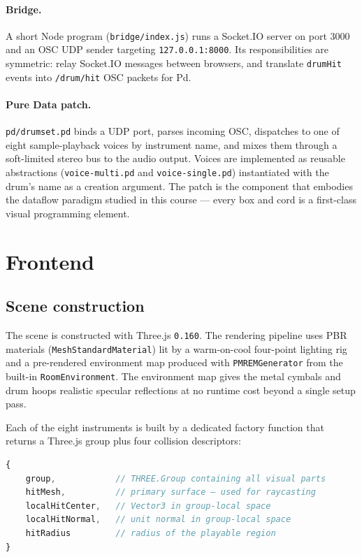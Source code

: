 \documentclass[11pt,a4paper]{article}
\begin{document}
\paragraph{Bridge.} A short Node program (\texttt{bridge/index.js})
runs a Socket.IO server on port 3000 and an OSC UDP sender targeting
\texttt{127.0.0.1:8000}. Its responsibilities are symmetric: relay
Socket.IO messages between browsers, and translate \texttt{drumHit}
events into \texttt{/drum/hit} OSC packets for Pd.

\paragraph{Pure Data patch.} \texttt{pd/drumset.pd} binds a UDP port,
parses incoming OSC, dispatches to one of eight sample-playback
voices by instrument name, and mixes them through a soft-limited
stereo bus to the audio output. Voices are implemented as reusable
abstractions (\texttt{voice-multi.pd} and \texttt{voice-single.pd})
instantiated with the drum's name as a creation argument. The patch
is the component that embodies the dataflow paradigm studied in this
course --- every box and cord is a first-class visual programming
element.

\section{Frontend}

\subsection{Scene construction}

The scene is constructed with Three.js \texttt{0.160}. The
rendering pipeline uses PBR materials (\texttt{MeshStandardMaterial})
lit by a warm-on-cool four-point lighting rig and a pre-rendered
environment map produced with \texttt{PMREMGenerator} from the
built-in \texttt{RoomEnvironment}. The environment map gives the
metal cymbals and drum hoops realistic specular reflections at no
runtime cost beyond a single setup pass.

Each of the eight instruments is built by a dedicated factory function
that returns a Three.js group plus four collision descriptors:

\begin{lstlisting}[language=JavaScript]
{
    group,            // THREE.Group containing all visual parts
    hitMesh,          // primary surface — used for raycasting
    localHitCenter,   // Vector3 in group-local space
    localHitNormal,   // unit normal in group-local space
    hitRadius         // radius of the playable region
}
\end{lstlisting}
\end{document}
